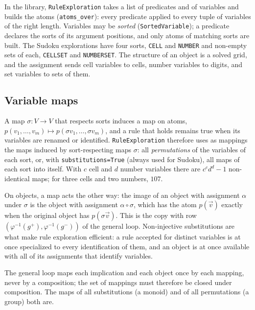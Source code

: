 \documentclass[11pt,a4paper]{article}
\theoremstyle{definition}
\theoremstyle{remark}
\newcommand{\code}[1]{\texttt{#1}}
\newcommand{\pos}{^{+}}
\newcommand{\nega}{^{-}}
\begin{document}
In the library, \code{RuleExploration} takes a list of predicates and of variables and builds the atoms (\code{atoms\_over}): every predicate applied to every tuple of variables of the right length. Variables may be \emph{sorted} (\code{SortedVariable}); a predicate declares the sorts of its argument positions, and only atoms of matching sorts are built. The Sudoku explorations have four sorts, \code{CELL} and \code{NUMBER} and non-empty sets of each, \code{CELLSET} and \code{NUMBERSET}. The structure of an object is a solved grid, and the assignment sends cell variables to cells, number variables to digits, and set variables to sets of them.

\subsection{Variable maps}\label{sec:maps}

A map $\sigma \colon V \to V$ that respects sorts induces a map on atoms, $p(v_1, \dots, v_m) \mapsto p(\sigma v_1, \dots, \sigma v_m)$, and a rule that holds remains true when its variables are renamed or identified. \code{RuleExploration} therefore uses as mappings the maps induced by sort-respecting maps $\sigma$: all \emph{permutations} of the variables of each sort, or, with \code{substitutions=True} (always used for Sudoku), all maps of each sort into itself. With $c$ cell and $d$ number variables there are $c^c d^d - 1$ non-identical maps; for three cells and two numbers, $107$.

On objects, a map acts the other way: the image of an object with assignment $\alpha$ under $\sigma$ is the object with assignment $\alpha \circ \sigma$, which has the atom $p(\vec v)$ exactly when the original object has $p(\sigma \vec v)$. This is the copy with row $(\varphi^{-1}(g\pos), \varphi^{-1}(g\nega))$ of the general loop. Non-injective substitutions are what make rule exploration efficient: a rule accepted for distinct variables is at once specialized to every identification of them, and an object is at once available with all of its assignments that identify variables.

The general loop maps each implication and each object once by each mapping, never by a composition; the set of mappings must therefore be closed under composition. The maps of all substitutions (a monoid) and of all permutations (a group) both are.
\end{document}
